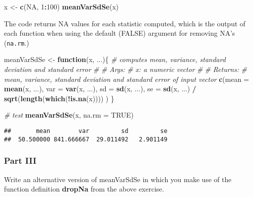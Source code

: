 \documentclass[12,]{article}
\newenvironment{Shaded}{\begin{snugshade}}{\end{snugshade}}
\newcommand{\KeywordTok}[1]{\textcolor[rgb]{0.13,0.29,0.53}{\textbf{#1}}}
\newcommand{\DataTypeTok}[1]{\textcolor[rgb]{0.13,0.29,0.53}{#1}}
\newcommand{\DecValTok}[1]{\textcolor[rgb]{0.00,0.00,0.81}{#1}}
\newcommand{\StringTok}[1]{\textcolor[rgb]{0.31,0.60,0.02}{#1}}
\newcommand{\CommentTok}[1]{\textcolor[rgb]{0.56,0.35,0.01}{\textit{#1}}}
\newcommand{\OtherTok}[1]{\textcolor[rgb]{0.56,0.35,0.01}{#1}}
\newcommand{\ControlFlowTok}[1]{\textcolor[rgb]{0.13,0.29,0.53}{\textbf{#1}}}
\newcommand{\OperatorTok}[1]{\textcolor[rgb]{0.81,0.36,0.00}{\textbf{#1}}}
\newcommand{\NormalTok}[1]{#1}
\begin{document}
\begin{Shaded}
\begin{Highlighting}[]
\NormalTok{x <-}\StringTok{ }\KeywordTok{c}\NormalTok{(}\OtherTok{NA}\NormalTok{, }\DecValTok{1}\OperatorTok{:}\DecValTok{100}\NormalTok{)}
\KeywordTok{meanVarSdSe}\NormalTok{(x)}
\end{Highlighting}
\end{Shaded}

The code returns NA values for each statistic computed, which is the
output of each function when using the default (FALSE) argument for
removing NA's (\texttt{na.rm}.)

\begin{Shaded}
\begin{Highlighting}[]
\NormalTok{meanVarSdSe <-}\StringTok{ }\ControlFlowTok{function}\NormalTok{(x, ...)\{}
  \CommentTok{# computes mean, variance, standard deviation and standard error}
  \CommentTok{#}
  \CommentTok{# Args:}
  \CommentTok{#   x: a numeric vector}
  \CommentTok{#}
  \CommentTok{# Returns:}
  \CommentTok{#   mean, variance, standard deviation and standard error of input vector}
  \KeywordTok{c}\NormalTok{(}\DataTypeTok{mean =} \KeywordTok{mean}\NormalTok{(x, ...),}
    \DataTypeTok{var =} \KeywordTok{var}\NormalTok{(x, ...),}
    \DataTypeTok{sd =} \KeywordTok{sd}\NormalTok{(x, ...),}
    \DataTypeTok{se =} \KeywordTok{sd}\NormalTok{(x, ...) }\OperatorTok{/}\StringTok{ }\KeywordTok{sqrt}\NormalTok{(}\KeywordTok{length}\NormalTok{(}\KeywordTok{which}\NormalTok{(}\OperatorTok{!}\KeywordTok{is.na}\NormalTok{(x))))}
\NormalTok{  )}
\NormalTok{\}}

\CommentTok{# test}
\KeywordTok{meanVarSdSe}\NormalTok{(x, }\DataTypeTok{na.rm =} \OtherTok{TRUE}\NormalTok{)}
\end{Highlighting}
\end{Shaded}

\begin{verbatim}
##       mean        var         sd         se 
##  50.500000 841.666667  29.011492   2.901149
\end{verbatim}

\subsubsection*{Part III}\label{part-iii}

Write an alternative version of meanVarSdSe in which you make use of the
function definition \textbf{dropNa} from the above exercise.
\end{document}
